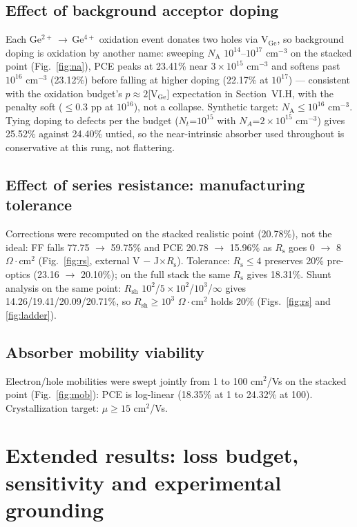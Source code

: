 \documentclass[aip,jap,amsmath,amssymb,preprint]{revtex4-2}
\begin{document}
\subsection{Effect of background acceptor doping}
Each Ge$^{2+}$\,$\rightarrow$\,Ge$^{4+}$ oxidation event donates two holes via V$_{\mathrm{Ge}}$, so background doping is oxidation by another name: sweeping $N_{\mathrm{A}}$ $10^{14}$--$10^{17}$ cm$^{-3}$ on the stacked point (Fig.~\ref{fig:na}), PCE peaks at 23.41\% near $3\times10^{15}$ cm$^{-3}$ and softens past $10^{16}$ cm$^{-3}$ (23.12\%) before falling at higher doping (22.17\% at $10^{17}$) --- consistent with the oxidation budget's $p\approx2$[V$_{\mathrm{Ge}}$] expectation in Section~VI.H, with the penalty soft ($\le$0.3 pp at $10^{16}$), not a collapse. Synthetic target: $N_{\mathrm{A}}\le10^{16}$ cm$^{-3}$. Tying doping to defects per the budget ($N_{t}$=$10^{15}$ with $N_{A}$=$2\times10^{15}$ cm$^{-3}$) gives 25.52\% against 24.40\% untied, so the near-intrinsic absorber used throughout is conservative at this rung, not flattering.
\subsection{Effect of series resistance: manufacturing tolerance}
Corrections were recomputed on the stacked realistic point (20.78\%), not the ideal: FF falls 77.75 $\rightarrow$ 59.75\% and PCE 20.78 $\rightarrow$ 15.96\% as $R_{\mathrm{s}}$ goes 0 $\rightarrow$ 8 $\Omega\cdot$cm$^{2}$ (Fig.~\ref{fig:rs}, external V $-$ J$\times$$R_{\mathrm{s}}$). Tolerance: $R_{\mathrm{s}}\le4$ preserves 20\% pre-optics (23.16 $\rightarrow$ 20.10\%); on the full stack the same $R_{\mathrm{s}}$ gives 18.31\%. Shunt analysis on the same point: $R_{\mathrm{sh}}$ $10^{2}$/$5\times10^{2}$/$10^{3}$/$\infty$ gives 14.26/19.41/20.09/20.71\%, so $R_{\mathrm{sh}}\ge10^{3}$ $\Omega\cdot$cm$^{2}$ holds 20\% (Figs.~\ref{fig:rs} and \ref{fig:ladder}).
\subsection{Absorber mobility viability}
Electron/hole mobilities were swept jointly from 1 to 100 cm$^{2}$/Vs on the stacked point (Fig.~\ref{fig:mob}): PCE is log-linear (18.35\% at 1 to 24.32\% at 100). Crystallization target: $\mu\ge15$ cm$^{2}$/Vs.


\section{Extended results: loss budget, sensitivity and experimental grounding}
\end{document}
